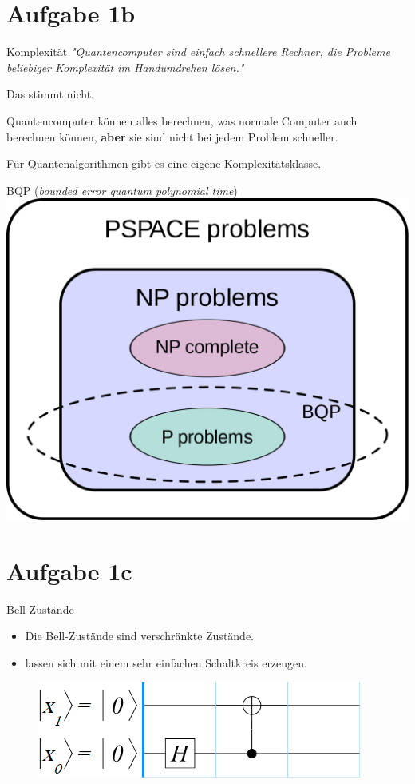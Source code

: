 \documentclass[fleqn,compress,utf8,aspectratio=169,t]{beamer}
\begin{document}
\section{Aufgabe 1b}

\begin{frame}{Komplexität}
\textit{"Quantencomputer sind einfach schnellere Rechner, die Probleme beliebiger Komplexität
im Handumdrehen lösen."}

Das stimmt nicht.

Quantencomputer können alles berechnen, was normale Computer auch berechnen können, \textbf{aber} sie sind nicht bei jedem Problem schneller.

Für Quantenalgorithmen gibt es eine eigene Komplexitätsklasse.

\end{frame}

\begin{frame}{BQP (\textit{bounded error quantum polynomial time})}
\centering
\includegraphics[height=.8\textheight]{images/1280px-BQP_complexity_class_diagram.svg.png}
\end{frame}

\section{Aufgabe 1c}

\begin{frame}{Bell Zustände}
\begin{itemize}
	\item Die Bell-Zustände sind verschränkte Zustände.
	\item lassen sich mit einem sehr einfachen Schaltkreis erzeugen.
\end{itemize}
\begin{figure}
	\centering
	\includegraphics[height=.3\textheight]{images/1c.png}
\end{figure}
\end{frame}
\end{document}
